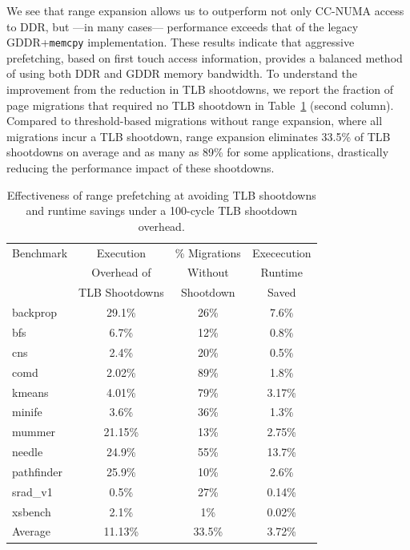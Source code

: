 We see that range expansion allows us to outperform not only CC-NUMA access to DDR, but ---in many cases--- performance
exceeds that of the legacy GDDR+{\tt memcpy} implementation.  These results indicate that aggressive prefetching, 
based on first touch access information, provides a balanced method of using both DDR and GDDR
memory bandwidth.  To understand the improvement 
from the reduction in TLB shootdowns, we report the fraction of 
page migrations that required no TLB shootdown in Table~\ref{tab:shootdowns} (second column).  Compared to  
threshold-based migrations without range expansion, where all migrations incur a TLB shootdown, range expansion 
eliminates 33.5\% of TLB shootdowns on average and as many as 89\% for some applications, drastically 
reducing the performance impact of these shootdowns.

\begin{table}[bh!]
\begin{center}
\begin{small}
\begin{tabular}{|l|c|c|c|}
\hline
Benchmark & Execution & \% Migrations & Exececution\\
          & Overhead of        &Without  & Runtime\\
          & TLB Shootdowns    & Shootdown & Saved\\
\hline
backprop & 29.1\%& 26\% & 7.6\%\\
bfs & 6.7\%&12\% & 0.8\%\\
cns & 2.4\%&20\% & 0.5\%\\
comd & 2.02\%&89\% & 1.8\%\\
kmeans & 4.01\%&79\% & 3.17\%\\
minife & 3.6\%&36\% & 1.3\%\\
mummer & 21.15\%&13\% & 2.75\%\\
needle & 24.9\%&55\% & 13.7\%\\
pathfinder & 25.9\%&10\% & 2.6\%\\
srad\_v1 & 0.5\%&27\% & 0.14\%\\
xsbench & 2.1\%&1\% & 0.02\%\\
\hline
Average & 11.13\%&33.5\% & 3.72\%\\
\hline
\end{tabular}
\caption{Effectiveness of range prefetching at avoiding TLB shootdowns and runtime savings under a 100-cycle TLB shootdown overhead.}
\label{tab:shootdowns}
\end{small}
\end{center}
\end{table}

